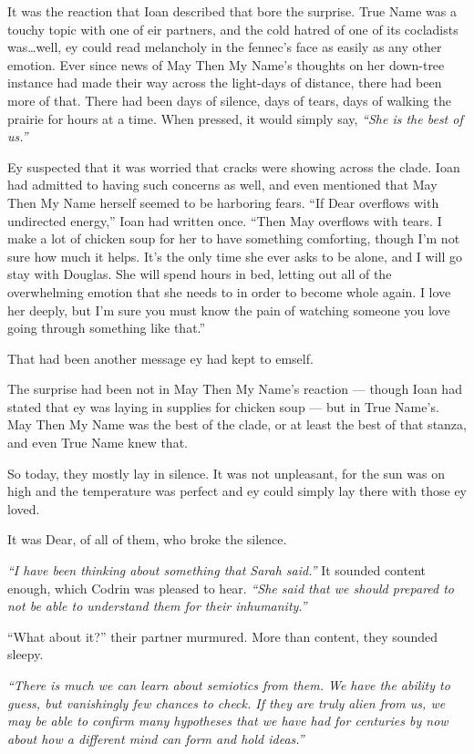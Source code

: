 It was the reaction that Ioan described that bore the surprise. True Name was a touchy topic with one of eir partners, and the cold hatred of one of its cocladists was\ldots well, ey could read melancholy in the fennec's face as easily as any other emotion. Ever since news of May Then My Name's thoughts on her down-tree instance had made their way across the light-days of distance, there had been more of that. There had been days of silence, days of tears, days of walking the prairie for hours at a time. When pressed, it would simply say, \emph{``She is the best of us.''}

Ey suspected that it was worried that cracks were showing across the clade. Ioan had admitted to having such concerns as well, and even mentioned that May Then My Name herself seemed to be harboring fears. ``If Dear overflows with undirected energy,'' Ioan had written once. ``Then May overflows with tears. I make a lot of chicken soup for her to have something comforting, though I'm not sure how much it helps. It's the only time she ever asks to be alone, and I will go stay with Douglas. She will spend hours in bed, letting out all of the overwhelming emotion that she needs to in order to become whole again. I love her deeply, but I'm sure you must know the pain of watching someone you love going through something like that.''

That had been another message ey had kept to emself.

The surprise had been not in May Then My Name's reaction — though Ioan had stated that ey was laying in supplies for chicken soup — but in True Name's. May Then My Name was the best of the clade, or at least the best of that stanza, and even True Name knew that.

So today, they mostly lay in silence. It was not unpleasant, for the sun was on high and the temperature was perfect and ey could simply lay there with those ey loved.

It was Dear, of all of them, who broke the silence.

\emph{``I have been thinking about something that Sarah said.''} It sounded content enough, which Codrin was pleased to hear. \emph{``She said that we should prepared to not be able to understand them for their inhumanity.''}

``What about it?'' their partner murmured. More than content, they sounded sleepy.

\emph{``There is much we can learn about semiotics from them. We have the ability to guess, but vanishingly few chances to check. If they are truly alien from us, we may be able to confirm many hypotheses that we have had for centuries by now about how a different mind can form and hold ideas.''}

